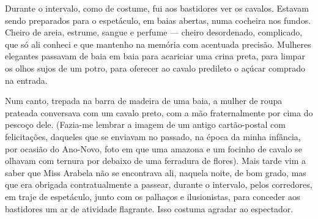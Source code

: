 

Durante o intervalo, como de costume, fui aos bastidores ver os cavalos.
Estavam sendo preparados para o espetáculo, em baias abertas, numa
cocheira nos fundos. Cheiro de areia, estrume, sangue e perfume ---
cheiro desordenado, complicado, que só ali conheci e que mantenho na
memória com acentuada precisão. Mulheres elegantes passavam de baia em
baia para acariciar uma crina preta, para limpar os olhos sujos de um
potro, para oferecer ao cavalo predileto o açúcar comprado na entrada.

Num canto, trepada na barra de madeira de uma baia, a mulher de roupa
prateada conversava com um cavalo preto, com a mão fraternalmente por
cima do pescoço dele. (Fazia-me lembrar a imagem de um antigo
cartão-postal com felicitações, daqueles que se enviavam no passado, na
época da minha infância, por ocasião do Ano-Novo, foto em que uma
amazona e um focinho de cavalo se olhavam com ternura por debaixo de uma
ferradura de flores). Mais tarde vim a saber que Miss Arabela não se
encontrava ali, naquela noite, de bom grado, mas que era obrigada
contratualmente a passear, durante o intervalo, pelos corredores, em
traje de espetáculo, junto com os palhaços e ilusionistas, para conceder
aos bastidores um ar de atividade flagrante. Isso costuma agradar ao
espectador.

